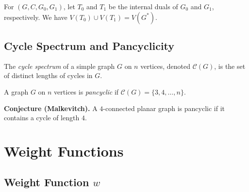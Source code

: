\begin{definition}
  \label{def:internal_dual_trees}
  \notready
  For $(G, C, G_0, G_1)$, let $T_0$ and $T_1$ be the internal duals of
  $G_0$ and $G_1$, respectively. We have
  $V(T_0) \cup V(T_1) = V(G^*)$.
\end{definition}


\section{Cycle Spectrum and Pancyclicity}

\begin{definition}
  \label{def:cycle_spectrum}
  \notready
  The \emph{cycle spectrum} of a simple graph $G$ on $n$ vertices, denoted
  $\mathcal{C}(G)$, is the set of distinct lengths of cycles in $G$.
\end{definition}

\begin{definition}[Pancyclicity]
  \label{def:pancyclic}
  \notready
  A graph $G$ on $n$ vertices is \emph{pancyclic} if
  $\mathcal{C}(G) = \{3, 4, \ldots, n\}$.
\end{definition}

\begin{definition}
  \label{def:malkevitch_conjecture}
  \notready
  \textbf{Conjecture (Malkevitch).}
  A $4$-connected planar graph is pancyclic if it contains a cycle of
  length $4$.
\end{definition}

\chapter{Weight Functions}

\section{Weight Function $w$}


